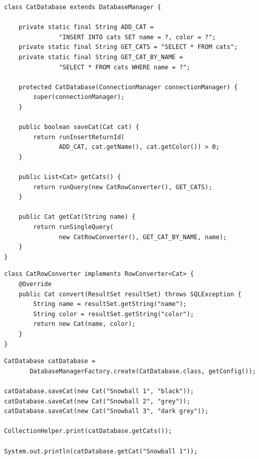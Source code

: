 \begin{codelisting}
\begin{lstlisting}[label=lst:persistence2,caption=Domain specific database manager]
class CatDatabase extends DatabaseManager {

    private static final String ADD_CAT = 
               "INSERT INTO cats SET name = ?, color = ?";
    private static final String GET_CATS = "SELECT * FROM cats";
    private static final String GET_CAT_BY_NAME = 
               "SELECT * FROM cats WHERE name = ?";

    protected CatDatabase(ConnectionManager connectionManager) {
        super(connectionManager);
    }

    public boolean saveCat(Cat cat) {
        return runInsertReturnId(
               ADD_CAT, cat.getName(), cat.getColor()) > 0;
    }

    public List<Cat> getCats() {
        return runQuery(new CatRowConverter(), GET_CATS);
    }

    public Cat getCat(String name) {
        return runSingleQuery(
               new CatRowConverter(), GET_CAT_BY_NAME, name);
    }
}
\end{lstlisting}
\end{codelisting}
	
\begin{codelisting}
\begin{lstlisting}[label=lst:persistence3,caption=Row converter for domain objects]
class CatRowConverter implements RowConverter<Cat> {
    @Override
    public Cat convert(ResultSet resultSet) throws SQLException {
        String name = resultSet.getString("name");
        String color = resultSet.getString("color");
        return new Cat(name, color);
    }
}
\end{lstlisting}
\end{codelisting}

\begin{codelisting}
\begin{lstlisting}[label=lst:persistence4,caption=Usage example]
CatDatabase catDatabase = 
       DatabaseManagerFactory.create(CatDatabase.class, getConfig());

catDatabase.saveCat(new Cat("Snowball 1", "black"));
catDatabase.saveCat(new Cat("Snowball 2", "grey"));
catDatabase.saveCat(new Cat("Snowball 3", "dark grey"));

CollectionHelper.print(catDatabase.getCats());

System.out.println(catDatabase.getCat("Snowball 1"));
\end{lstlisting}
\end{codelisting}
